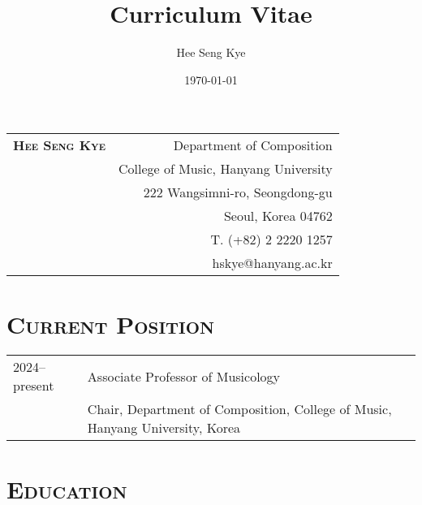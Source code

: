 \documentclass[a4paper,11pt,draft]{article}
\title{Curriculum Vitae}
\author{Hee Seng Kye}
\date{\today}
\begin{document}
  \renewcommand{\headrulewidth}{0pt}
  \fancyhf{}
  \fancyfoot[RE,RO]{\small \thepage}
  
  \raggedright \parindent=15pt
  
  \hspace*{-0.8cm}
  \begin{tabular}{p{9.72cm} r}
    {\Large \textsc{\textbf{Hee Seng Kye}}} & Department of Composition\\
    & College of Music, Hanyang University\\
    & 222 Wangsimni-ro, Seongdong-gu\\
    & Seoul, Korea 04762\\
    & T. (+82) 2 2220 1257\\
    & hskye@hanyang.ac.kr
  \end{tabular}
  
  \vspace{10mm}
  
  \section*{\textsc{Current Position}}
  
  \hspace*{-0.25cm}
  \begin{tabular}{p{2.5cm} l}
    2024--present & Associate Professor of Musicology\\
    & Chair, Department of Composition, College of Music, Hanyang University, Korea
  \end{tabular}
  
  \vspace*{5mm}
  
  \section*{\textsc{Education}}
  
\end{document}
